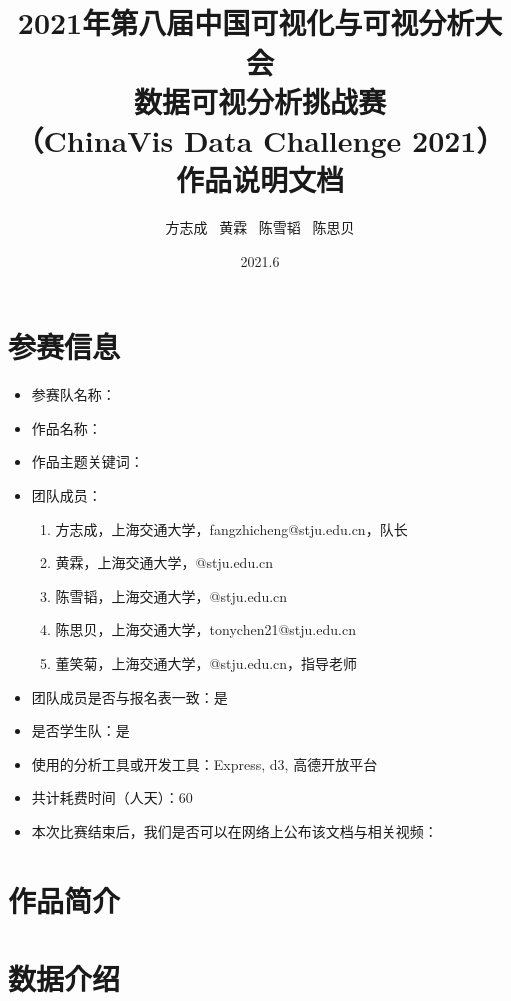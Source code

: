 \documentclass[UTF8]{ctexrep}
\title{
    \horrule{0.5pt} \\[0.4cm]
    \huge 2021年第八届中国可视化与可视分析大会\\
    数据可视分析挑战赛\\
    （ChinaVis Data Challenge 2021）\\
    作品说明文档\\
    \horrule{2pt}
}
\author{
    方志成 \ 黄霖 \ 陈雪韬 \ 陈思贝
}
\date{
    2021.6
}
\begin{document}
    \maketitle

    \section{参赛信息}

    \begin{itemize}
        \item 参赛队名称：
        \item 作品名称：
        \item 作品主题关键词：
        \item 团队成员：
        \begin{enumerate}
            \item 方志成，上海交通大学，fangzhicheng@stju.edu.cn，队长
            \item 黄霖，上海交通大学，@stju.edu.cn
            \item 陈雪韬，上海交通大学，@stju.edu.cn
            \item 陈思贝，上海交通大学，tonychen21@stju.edu.cn
            \item 董笑菊，上海交通大学，@stju.edu.cn，指导老师
        \end{enumerate}
        \item 团队成员是否与报名表一致：是
        \item 是否学生队：是
        \item 使用的分析工具或开发工具：Express, d3, 高德开放平台
        \item 共计耗费时间（人天）：60
        \item 本次比赛结束后，我们是否可以在网络上公布该文档与相关视频：
    \end{itemize}

    \section{作品简介}

    \section{数据介绍}
\end{document}
